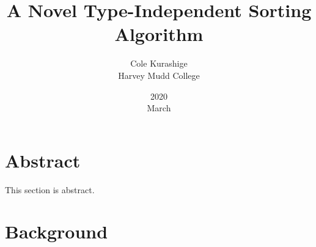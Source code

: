 \documentclass{article}
\title{A Novel Type-Independent Sorting Algorithm}
\author{Cole Kurashige \\ Harvey Mudd College}
\date{2020 \\ March}
\begin{document}
\section{Abstract}
This section is abstract.

\section{Background}
\end{document}
